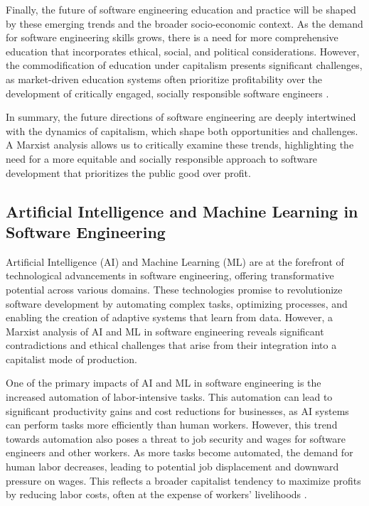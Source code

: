 \begin{refsection}
Finally, the future of software engineering education and practice will be shaped by these emerging trends and the broader socio-economic context. As the demand for software engineering skills grows, there is a need for more comprehensive education that incorporates ethical, social, and political considerations. However, the commodification of education under capitalism presents significant challenges, as market-driven education systems often prioritize profitability over the development of critically engaged, socially responsible software engineers \cite[pp.~23-26]{giroux2019neoliberalism}.

In summary, the future directions of software engineering are deeply intertwined with the dynamics of capitalism, which shape both opportunities and challenges. A Marxist analysis allows us to critically examine these trends, highlighting the need for a more equitable and socially responsible approach to software development that prioritizes the public good over profit.

\subsection{Artificial Intelligence and Machine Learning in Software Engineering}

Artificial Intelligence (AI) and Machine Learning (ML) are at the forefront of technological advancements in software engineering, offering transformative potential across various domains. These technologies promise to revolutionize software development by automating complex tasks, optimizing processes, and enabling the creation of adaptive systems that learn from data. However, a Marxist analysis of AI and ML in software engineering reveals significant contradictions and ethical challenges that arise from their integration into a capitalist mode of production.

One of the primary impacts of AI and ML in software engineering is the increased automation of labor-intensive tasks. This automation can lead to significant productivity gains and cost reductions for businesses, as AI systems can perform tasks more efficiently than human workers. However, this trend towards automation also poses a threat to job security and wages for software engineers and other workers. As more tasks become automated, the demand for human labor decreases, leading to potential job displacement and downward pressure on wages. This reflects a broader capitalist tendency to maximize profits by reducing labor costs, often at the expense of workers' livelihoods \cite[pp.~375-377]{marx2008capital}.


\end{refsection}
